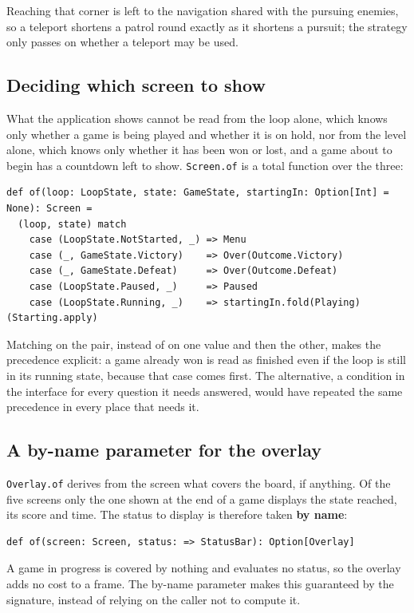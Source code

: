 Reaching that corner is left to the navigation shared with the pursuing enemies, so a teleport shortens a patrol round
exactly as it shortens a pursuit; the strategy only passes on whether a teleport may be used.

\subsection{Deciding which screen to show}

What the application shows cannot be read from the loop alone, which knows only whether a game is being played and
whether it is on hold, nor from the level alone, which knows only whether it has been won or lost, and a game about to
begin has a countdown left to show. \texttt{Screen.of} is a total function over the three:

\begin{lstlisting}
def of(loop: LoopState, state: GameState, startingIn: Option[Int] = None): Screen =
  (loop, state) match
    case (LoopState.NotStarted, _) => Menu
    case (_, GameState.Victory)    => Over(Outcome.Victory)
    case (_, GameState.Defeat)     => Over(Outcome.Defeat)
    case (LoopState.Paused, _)     => Paused
    case (LoopState.Running, _)    => startingIn.fold(Playing)(Starting.apply)
\end{lstlisting}

Matching on the pair, instead of on one value and then the other, makes the precedence explicit: a game already
won is read as finished even if the loop is still in its running state, because that case comes first. The
alternative, a condition in the interface for every question it needs answered, would have repeated the same precedence in every place that needs it.

\subsection{A by-name parameter for the overlay}

\texttt{Overlay.of} derives from the screen what covers the board, if anything. Of the five screens only the one
shown at the end of a game displays the state reached, its score and time. The status to display is therefore taken \textbf{by name}:

\begin{lstlisting}
def of(screen: Screen, status: => StatusBar): Option[Overlay]
\end{lstlisting}

A game in progress is covered by nothing and evaluates no status, so the overlay adds no cost to a frame. The by-name parameter makes this guaranteed by the signature, instead of relying on the caller not to compute it.

